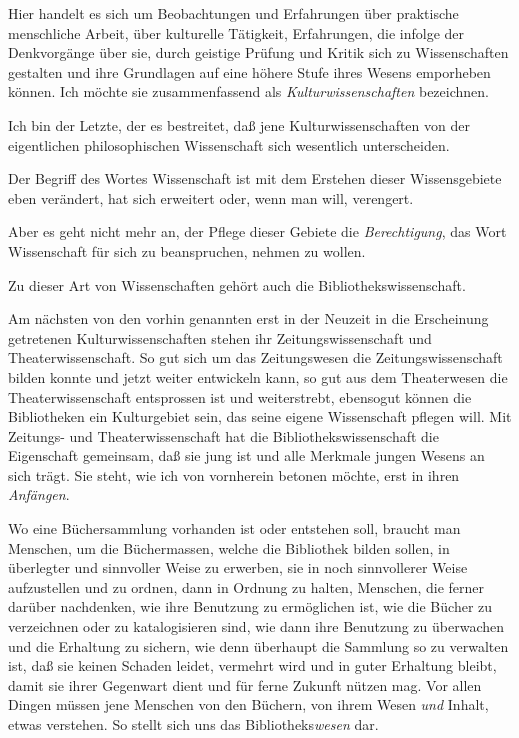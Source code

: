 \documentclass[a4paper,
fontsize=11pt,
oneside,
numbers=noperiodatend,
parskip=half-,
bibliography=totoc,
final
]{scrartcl}
\begin{document}
Hier handelt es sich um Beobachtungen und Erfahrungen über praktische
menschliche Arbeit, über kulturelle Tätigkeit, Erfahrungen, die infolge
der Denkvorgänge über sie, durch geistige Prüfung und Kritik sich zu
Wissenschaften gestalten und ihre Grundlagen auf eine höhere Stufe ihres
Wesens emporheben können. Ich möchte sie zusammenfassend als
\emph{Kulturwissenschaften} bezeichnen.

Ich bin der Letzte, der es bestreitet, daß jene Kulturwissenschaften von
der eigentlichen philosophischen Wissenschaft sich wesentlich
unterscheiden.

Der Begriff des Wortes Wissenschaft ist mit dem Erstehen dieser
Wissensgebiete eben verändert, hat sich erweitert oder, wenn man will,
verengert.

Aber es geht nicht mehr an, der Pflege dieser Gebiete die
\emph{Berechtigung}, das Wort Wissenschaft für sich zu beanspruchen,
nehmen zu wollen.

Zu dieser Art von Wissenschaften gehört auch die
Bibliothekswissenschaft.

Am nächsten von den vorhin genannten erst in der Neuzeit in die
Erscheinung getretenen Kulturwissenschaften stehen ihr
Zeitungswissenschaft und Theaterwissenschaft. So gut sich um das
Zeitungswesen die Zeitungswissenschaft bilden konnte und jetzt weiter
entwickeln kann, so gut aus dem Theaterwesen die Theaterwissenschaft
entsprossen ist und weiterstrebt, ebensogut können die Bibliotheken ein
Kulturgebiet sein, das seine eigene Wissenschaft pflegen will. Mit
Zeitungs- und Theaterwissenschaft hat die Bibliothekswissenschaft die
Eigenschaft gemeinsam, daß sie jung ist und alle Merkmale jungen Wesens
an sich trägt. Sie steht, wie ich von vornherein betonen möchte, erst in
ihren \emph{Anfängen}.

Wo eine Büchersammlung vorhanden ist oder entstehen soll, braucht man
Menschen, um die Büchermassen, welche die Bibliothek bilden sollen, in
überlegter und sinnvoller Weise zu erwerben, sie in noch sinnvollerer
Weise aufzustellen und zu ordnen, dann in Ordnung zu halten, Menschen,
die ferner darüber nachdenken, wie ihre Benutzung zu ermöglichen ist,
wie die Bücher zu verzeichnen oder zu katalogisieren sind, wie dann ihre
Benutzung zu überwachen und die Erhaltung zu sichern, wie denn überhaupt
die Sammlung so zu verwalten ist, daß sie keinen Schaden leidet,
vermehrt wird und in guter Erhaltung bleibt, damit sie ihrer Gegenwart
dient und für ferne Zukunft nützen mag. Vor allen Dingen müssen jene
Menschen von den Büchern, von ihrem Wesen \emph{und} Inhalt, etwas
verstehen. So stellt sich uns das Bibliotheks\emph{wesen} dar.
\end{document}
